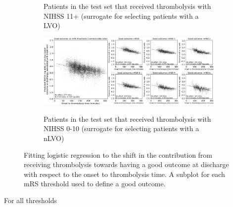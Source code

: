 \begin{figure}[!ht]
\begin{subfigure}[b]{1\textwidth}
      \caption{Patients in the test set that received thrombolysis with NIHSS 11+ (surrogate for selecting patients with a LVO)}
      \label{fig:shap_shift_lvo}
    \end{subfigure}
    \hfill
    \begin{subfigure}[b]{1\textwidth}
      \centering
      \includegraphics[width=1\textwidth]{./images/103_xgb_7_features_1fold_binary_improvement_logodds_bymRSthreshold_sns_subplots_nLVO_ivt_shap_paper}\\
      \caption{Patients in the test set that received thrombolysis with NIHSS 0-10 (surrogate for selecting patients with a nLVO)}
      \label{fig:shap_shift_nlvo}
    \end{subfigure}
    \label{fig:shap_shift}
    \caption{Fitting logistic regression to the shift in the contribution from receiving thrombolysis towards having a good outcome at discharge with respect to the onset to thrombolysis time. A subplot for each mRS threshold used to define a good outcome.}
\end{figure}








For all thresholds


